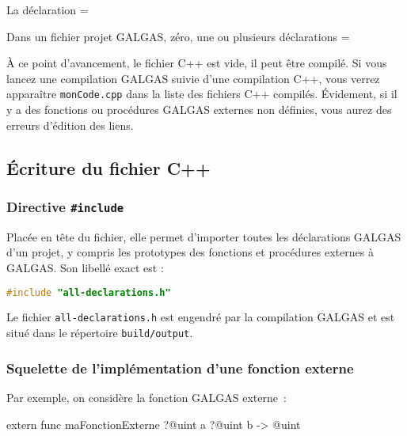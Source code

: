 La déclaration \ggst=%

Dans un fichier projet GALGAS, zéro, une ou plusieurs déclarations \ggst=%

À ce point d'avancement, le fichier C++ est vide, il peut être compilé. Si vous lancez une compilation GALGAS suivie d'une compilation C++, vous verrez apparaître \texttt{monCode.cpp} dans la liste des fichiers C++ compilés. Évidement, si il y a des fonctions ou procédures GALGAS externes non définies, vous aurez des erreurs d'édition des liens.





\subsection{Écriture du fichier C++}


\subsubsection{Directive \texttt{\#include}}

Placée en tête du fichier, elle permet d'importer toutes les déclarations GALGAS d'un projet, y compris les prototypes des fonctions et procédures externes à GALGAS. Son libellé exact est :

\begin{lstlisting}[language=C++]
#include "all-declarations.h"
\end{lstlisting}

Le fichier \texttt{all-declarations.h} est engendré par la compilation GALGAS et est situé dans le répertoire \texttt{build/output}.



\subsubsection{Squelette de l'implémentation d'une fonction externe}

Par exemple, on considère la fonction GALGAS externe~:
\begin{galgas3}
extern func maFonctionExterne ?@uint a ?@uint b -> @uint
\end{galgas3}

